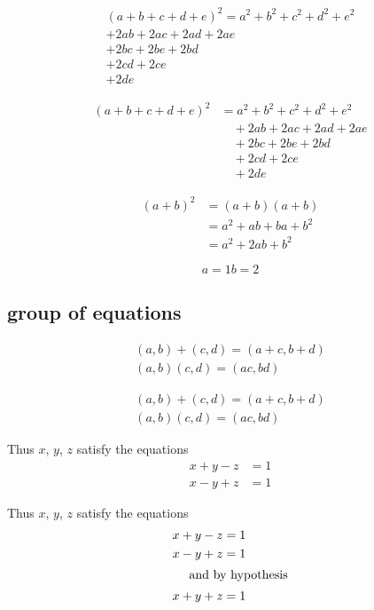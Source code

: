 \documentclass[a4paper, UTF8]{article}
\begin{document}
\begin{multline*}
    (a+b+c+d+e)^2=a^2+b^2+c^2+d^2+e^2\\
        +2ab+2ac+2ad+2ae\\
        +2bc+2be+2bd\\
        +2cd+2ce\\
        +2de
\end{multline*}


\begin{equation*}
    \begin{split}
        (a+b+c+d+e)^2 & =a^2+b^2+c^2+d^2+e^2\\
        &\quad+2ab+2ac+2ad+2ae\\
        &\quad+2bc+2be+2bd\\
        &\quad+2cd+2ce\\
        &\quad+2de
    \end{split}
\end{equation*}

\begin{equation*}
    \begin{split}
        (a+b)^2 & =(a+b)(a+b)\\
                & =a^2+ab+ba+b^2\\
                & = a^2+2ab+b^2
    \end{split}
\end{equation*}

\begin{equation}
    a = 1
    b=2    
\end{equation}

\subsection{\large group of equations}
\begin{gather*}
    (a,b)+(c,d)=(a+c,b+d)\\
    (a,b)(c,d)=(ac,bd)
\end{gather*}

\begin{gather}
    (a,b)+(c,d)=(a+c,b+d)\\
    (a,b)(c,d)=(ac,bd)
\end{gather}

Thus $x$, $y$, $z$ satisfy the equations
\begin{align*}
    x+y-z & =1\\
    x-y+z & =1
\end{align*}

Thus $x$, $y$, $z$ satisfy the equations
\begin{align*}
    x+y-z & =1\\
    x-y+z & =1\\
    \intertext{\quad\ and by hypothesis}
    x+y+z & =1
\end{align*}
\end{document}
